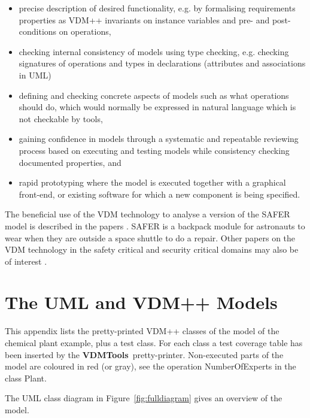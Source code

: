 \documentclass[\pformat,12pt,twoside]{article}
\newcommand{\vdmtools}{\textbf{VDMTools}}
\begin{document}
\begin{itemize}
\item
precise description of desired functionality, e.g. by formalising 
requirements properties as VDM++ invariants on instance variables 
and pre- and post-conditions on operations, 
\item
checking internal consistency of models using type checking, 
e.g. checking signatures of operations and types in declarations 
(attributes and associations in UML)
\item
defining and checking concrete aspects of models such as what 
operations should do, which would normally be expressed in natural 
language which is not checkable by tools, 
\item
gaining confidence in models through a systematic and repeatable 
reviewing process based on executing and testing models while 
consistency checking documented properties, and
\item
rapid prototyping where the model is executed together with a 
graphical front-end, or existing software for which a new component 
is being specified.
\end{itemize}


The beneficial use of the VDM technology to analyse a version 
of the SAFER model is described in the papers \cite{Agerholm&97c,Agerholm&99}. 
SAFER is a backpack module for astronauts to wear when they are 
outside a space shuttle to do a repair. Other papers on the VDM 
technology in the safety critical and security critical domains 
may also be of interest \cite{Agerholm&98a,Larsen&96a}.





\newpage
\appendix
\section{The UML and VDM++ Models}


This appendix lists the pretty-printed VDM++ classes of the model 
of the chemical plant example, plus a test class. For each class 
a test coverage table has been inserted by the \vdmtools\ pretty-printer. 
Non-executed parts of the model are coloured in red (or gray), 
see the operation NumberOfExperts in the class Plant.

The UML class diagram in Figure~\ref{fig:fulldiagram} gives an
overview of the model.
\end{document}
